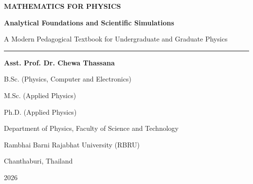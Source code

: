 \begin{titlepage}
    \centering
    \vspace*{1.5cm}
    
    {\Huge\bfseries\color{rbruNavy} MATHEMATICS FOR PHYSICS \par}
    \vspace{0.4cm}
    {\Large\bfseries\color{rbruGreen} Analytical Foundations and Scientific Simulations \par}
    \vspace{0.3cm}
    {\large\color{rbruSlate} A Modern Pedagogical Textbook for Undergraduate and Graduate Physics \par}
    
    \vspace{1.5cm}
    {\color{rbruGold}\rule{0.8\textwidth}{2pt}}
    \vspace{1.5cm}
    
    {\Large\textbf{Asst. Prof. Dr. Chewa Thassana}\par}
    \vspace{0.3cm}
    {\large B.Sc. (Physics, Computer and Electronics)\par}
    {\large M.Sc. (Applied Physics)\par}
    {\large Ph.D. (Applied Physics)\par}
    
    \vfill
    
    {\large Department of Physics, Faculty of Science and Technology\par}
    \vspace{0.2cm}
    {\large Rambhai Barni Rajabhat University (RBRU)\par}
    \vspace{0.2cm}
    {\large Chanthaburi, Thailand\par}
    \vspace{0.6cm}
    {\large 2026\par}
\end{titlepage}
